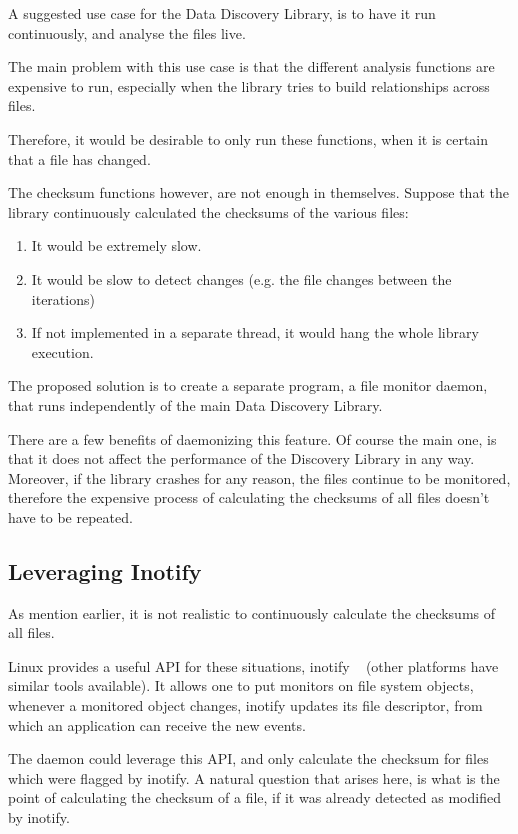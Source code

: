A suggested use case for the Data Discovery Library, is to have it run continuously, and analyse the files
live.

The main problem with this use case is that the different analysis functions are expensive to run,
especially when the library tries to build relationships across files.

Therefore, it would be desirable to only run these functions, when it is certain that a file has changed.

The checksum functions however, are not enough in themselves.
Suppose that the library continuously calculated the checksums of the various files:
\begin{enumerate}
    \item It would be extremely slow.
    \item It would be slow to detect changes (e.g. the file changes between the iterations)
    \item If not implemented in a separate thread, it would hang the whole library execution.
\end{enumerate}

The proposed solution is to create a separate program, a file monitor daemon, that runs independently
of the main Data Discovery Library.

There are a few benefits of daemonizing this feature.
Of course the main one, is that it does not affect the performance
of the Discovery Library in any way.
Moreover, if the library crashes for any reason, the files continue to be monitored,
therefore the expensive process of calculating the checksums of all files doesn't have to be repeated.

\subsection{Leveraging Inotify}
As mention earlier, it is not realistic to continuously calculate the checksums of all files.

Linux provides a useful API for these situations, inotify ~\cite{Inotify} (other platforms have similar tools available).
It allows one to put monitors on file system objects, whenever a monitored object changes, inotify updates its
file descriptor, from which an application can receive the new events.

The daemon could leverage this API, and only calculate the checksum for files which were flagged by inotify.
A natural question that arises here, is what is the point of calculating the checksum of a file,
if it was already detected as modified by inotify.

